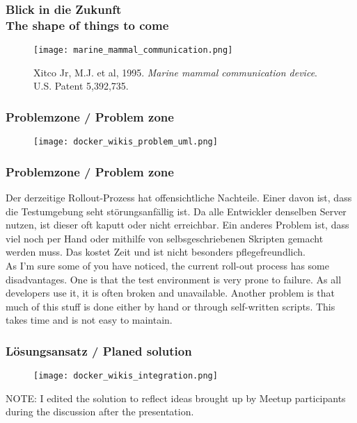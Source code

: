\documentclass[12pt]{beamer}
\begin{document}
\begin{frame}
  \frametitle{Blick in die Zukunft \\ \textcolor{mfn_green}{The shape of things to come}}
  \begin{figure}
    \texttt{[image: marine\_mammal\_communication.png]}
    \caption{Xitco Jr, M.J. et al, 1995. \textit{Marine mammal communication device}. U.S. Patent 5,392,735.}
  \end{figure}
\end{frame}

\begin{frame}
  \frametitle{Problemzone / \textcolor{mfn_green}{Problem zone}}
  \begin{figure}
    \texttt{[image: docker\_wikis\_problem\_uml.png]}
  \end{figure}
\end{frame}

{\scriptsize
\begin{frame}
  \frametitle{Problemzone / \textcolor{mfn_green}{Problem zone}}
  Der derzeitige Rollout-Prozess hat offensichtliche Nachteile. Einer davon ist, dass die Testumgebung seht störungsanfällig ist. Da alle Entwickler denselben Server nutzen, ist dieser oft kaputt oder nicht erreichbar. Ein anderes Problem ist, dass viel noch per Hand oder mithilfe von selbsgeschriebenen Skripten gemacht werden muss. Das kostet Zeit und ist nicht besonders pflegefreundlich.\\
  \bigskip
  \textcolor{mfn_green}{As I'm sure some of you have noticed, the current roll-out process has some disadvantages. One is that the test environment is very prone to failure. As all developers use it, it is often broken and unavailable. Another problem is that much of this stuff is done either by hand or through self-written scripts. This takes time and is not easy to maintain.}
\end{frame}
}
\begin{frame}
  \frametitle{Lösungsansatz / \textcolor{mfn_green}{Planed solution}}
  \begin{figure}
    \texttt{[image: docker\_wikis\_integration.png]}
  \end{figure}
  \textcolor{mfn_green}{NOTE: I edited the solution to reflect ideas brought up by Meetup participants during the discussion after the presentation.}
\end{frame}
\end{document}
